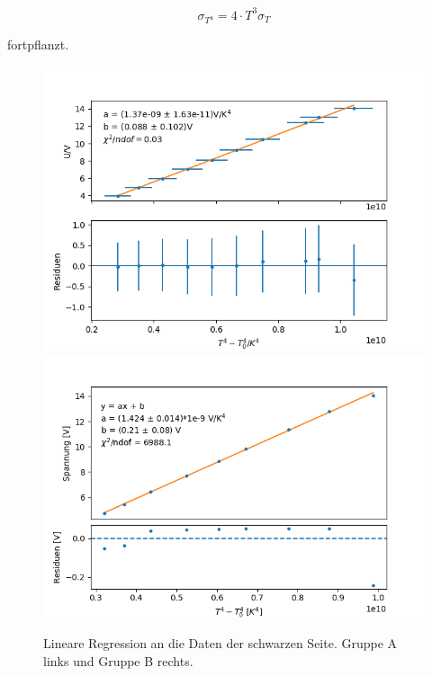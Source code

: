 \documentclass[12pt,a4paper]{article}
\begin{document}
\begin{equation}
\sigma_{T^4} = 4 \cdot T^3 \sigma_T
\end{equation}

fortpflanzt.

\begin{figure}
\centering
\includegraphics[scale=0.5]{Bilder/Schwarz_A}
\includegraphics[scale=0.5]{Bilder/schwarz_B}
\caption{Lineare Regression an die Daten der schwarzen Seite. Gruppe A links und Gruppe B rechts.}
\label{fig:RegSchwarz}
\end{figure}
\end{document}
